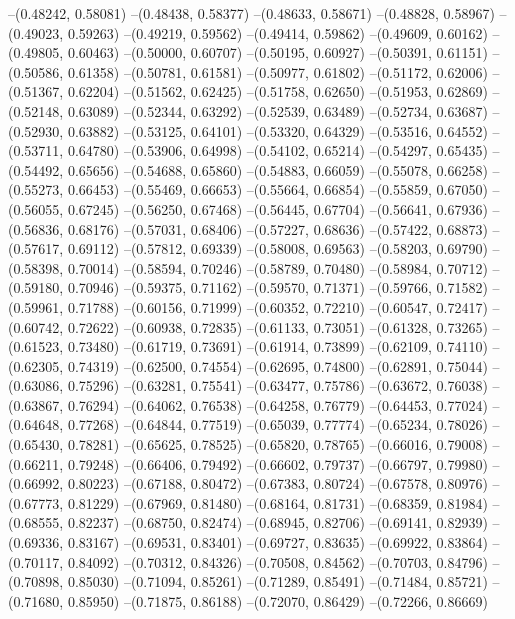--(0.48242, 0.58081)
--(0.48438, 0.58377)
--(0.48633, 0.58671)
--(0.48828, 0.58967)
--(0.49023, 0.59263)
--(0.49219, 0.59562)
--(0.49414, 0.59862)
--(0.49609, 0.60162)
--(0.49805, 0.60463)
--(0.50000, 0.60707)
--(0.50195, 0.60927)
--(0.50391, 0.61151)
--(0.50586, 0.61358)
--(0.50781, 0.61581)
--(0.50977, 0.61802)
--(0.51172, 0.62006)
--(0.51367, 0.62204)
--(0.51562, 0.62425)
--(0.51758, 0.62650)
--(0.51953, 0.62869)
--(0.52148, 0.63089)
--(0.52344, 0.63292)
--(0.52539, 0.63489)
--(0.52734, 0.63687)
--(0.52930, 0.63882)
--(0.53125, 0.64101)
--(0.53320, 0.64329)
--(0.53516, 0.64552)
--(0.53711, 0.64780)
--(0.53906, 0.64998)
--(0.54102, 0.65214)
--(0.54297, 0.65435)
--(0.54492, 0.65656)
--(0.54688, 0.65860)
--(0.54883, 0.66059)
--(0.55078, 0.66258)
--(0.55273, 0.66453)
--(0.55469, 0.66653)
--(0.55664, 0.66854)
--(0.55859, 0.67050)
--(0.56055, 0.67245)
--(0.56250, 0.67468)
--(0.56445, 0.67704)
--(0.56641, 0.67936)
--(0.56836, 0.68176)
--(0.57031, 0.68406)
--(0.57227, 0.68636)
--(0.57422, 0.68873)
--(0.57617, 0.69112)
--(0.57812, 0.69339)
--(0.58008, 0.69563)
--(0.58203, 0.69790)
--(0.58398, 0.70014)
--(0.58594, 0.70246)
--(0.58789, 0.70480)
--(0.58984, 0.70712)
--(0.59180, 0.70946)
--(0.59375, 0.71162)
--(0.59570, 0.71371)
--(0.59766, 0.71582)
--(0.59961, 0.71788)
--(0.60156, 0.71999)
--(0.60352, 0.72210)
--(0.60547, 0.72417)
--(0.60742, 0.72622)
--(0.60938, 0.72835)
--(0.61133, 0.73051)
--(0.61328, 0.73265)
--(0.61523, 0.73480)
--(0.61719, 0.73691)
--(0.61914, 0.73899)
--(0.62109, 0.74110)
--(0.62305, 0.74319)
--(0.62500, 0.74554)
--(0.62695, 0.74800)
--(0.62891, 0.75044)
--(0.63086, 0.75296)
--(0.63281, 0.75541)
--(0.63477, 0.75786)
--(0.63672, 0.76038)
--(0.63867, 0.76294)
--(0.64062, 0.76538)
--(0.64258, 0.76779)
--(0.64453, 0.77024)
--(0.64648, 0.77268)
--(0.64844, 0.77519)
--(0.65039, 0.77774)
--(0.65234, 0.78026)
--(0.65430, 0.78281)
--(0.65625, 0.78525)
--(0.65820, 0.78765)
--(0.66016, 0.79008)
--(0.66211, 0.79248)
--(0.66406, 0.79492)
--(0.66602, 0.79737)
--(0.66797, 0.79980)
--(0.66992, 0.80223)
--(0.67188, 0.80472)
--(0.67383, 0.80724)
--(0.67578, 0.80976)
--(0.67773, 0.81229)
--(0.67969, 0.81480)
--(0.68164, 0.81731)
--(0.68359, 0.81984)
--(0.68555, 0.82237)
--(0.68750, 0.82474)
--(0.68945, 0.82706)
--(0.69141, 0.82939)
--(0.69336, 0.83167)
--(0.69531, 0.83401)
--(0.69727, 0.83635)
--(0.69922, 0.83864)
--(0.70117, 0.84092)
--(0.70312, 0.84326)
--(0.70508, 0.84562)
--(0.70703, 0.84796)
--(0.70898, 0.85030)
--(0.71094, 0.85261)
--(0.71289, 0.85491)
--(0.71484, 0.85721)
--(0.71680, 0.85950)
--(0.71875, 0.86188)
--(0.72070, 0.86429)
--(0.72266, 0.86669)

